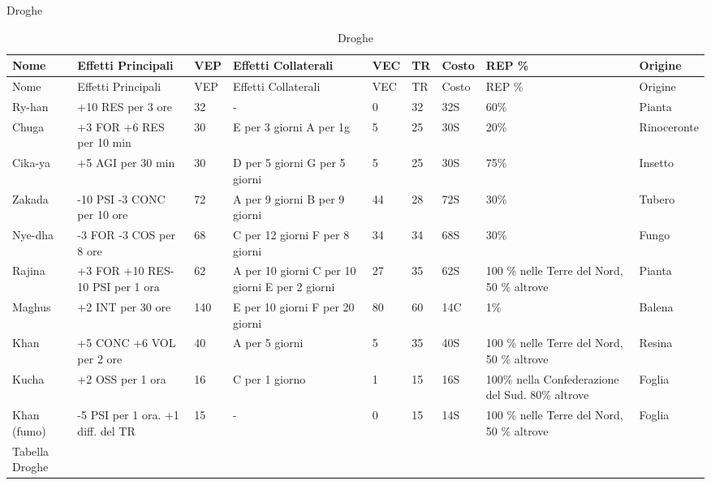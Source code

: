 {\setlength{\tabcolsep}{0.25em}
\centering

{\Large\sc Droghe}
\label{tabdroghe}

\footnotesize
\begin{longtable}{|l|p{2.5cm}|l|p{2.5cm}|l|l|l|p{3.4cm}|l|}
  \par
  \hline
  Nome& \raggedright Effetti Principali& \raggedright VEP& \raggedright Effetti Collaterali& \raggedright VEC& \raggedright TR& \raggedright Costo& \raggedright REP \%& \raggedright Origine\tabularnewline \hline\hline
  \endfirsthead
  \hline
  Nome& \raggedright Effetti Principali& \raggedright VEP& \raggedright Effetti Collaterali& \raggedright VEC& \raggedright TR& \raggedright Costo& \raggedright REP \%& \raggedright Origine\tabularnewline \hline\hline
  \endhead                                                                
  Ry-han& \raggedright +10 RES per 3 ore& \raggedright 32& \raggedright -& \raggedright 0& \raggedright 32& \raggedright 32S& \raggedright 60\%& \raggedright Pianta\tabularnewline \hline
  Chuga& \raggedright +3 FOR +6 RES per 10 min& \raggedright 30& \raggedright E per 3 giorni A per 1g& \raggedright 5& \raggedright 25& \raggedright 30S& \raggedright 20\%& \raggedright Rinoceronte\tabularnewline \hline
  Cika-ya& \raggedright +5 AGI per 30 min& \raggedright 30& \raggedright D per 5 giorni G per 5 giorni& \raggedright 5& \raggedright 25& \raggedright 30S& \raggedright 75\%& \raggedright Insetto\tabularnewline \hline
  Zakada& \raggedright -10 PSI -3 CONC per 10 ore& \raggedright 72& \raggedright A per 9 giorni B per 9 giorni& \raggedright 44& \raggedright 28& \raggedright 72S& \raggedright 30\%& \raggedright Tubero\tabularnewline \hline
  Nye-dha& \raggedright -3 FOR -3 COS per 8 ore& \raggedright 68& \raggedright C per 12 giorni F per 8 giorni& \raggedright 34& \raggedright 34& \raggedright 68S& \raggedright 30\%& \raggedright Fungo\tabularnewline \hline
  Rajina& \raggedright +3 FOR +10 RES-10 PSI per 1 ora& \raggedright 62& \raggedright A per 10 giorni C per 10 giorni E per 2 giorni& \raggedright 27& \raggedright 35& \raggedright 62S& \raggedright 100 \% nelle Terre del Nord, 50 \% altrove& \raggedright Pianta\tabularnewline \hline
  Maghus& \raggedright +2 INT per 30 ore& \raggedright 140& \raggedright E per 10 giorni F per 20 giorni& \raggedright 80& \raggedright 60& \raggedright 14C& \raggedright 1\%& \raggedright Balena\tabularnewline \hline
  Khan& \raggedright +5 CONC +6 VOL per 2 ore& \raggedright 40& \raggedright A per 5 giorni & \raggedright 5& \raggedright 35& \raggedright 40S& \raggedright 100 \% nelle Terre del Nord, 50 \% altrove& \raggedright Resina\tabularnewline \hline
  Kucha& \raggedright +2 OSS per 1 ora& \raggedright 16& \raggedright C per 1 giorno & \raggedright 1& \raggedright 15& \raggedright 16S& \raggedright 100\% nella Confederazione del Sud. 80\% altrove& \raggedright Foglia\tabularnewline \hline
  Khan (fumo)& \raggedright -5 PSI per 1 ora. +1 diff. del TR& \raggedright 15& \raggedright -& \raggedright 0& \raggedright 15& \raggedright 14S& \raggedright 100 \% nelle Terre del Nord, 50 \% altrove& \raggedright Foglia\tabularnewline \hline
  \caption{Droghe}{Tabella Droghe}\tabularnewline
\end{longtable}
}

